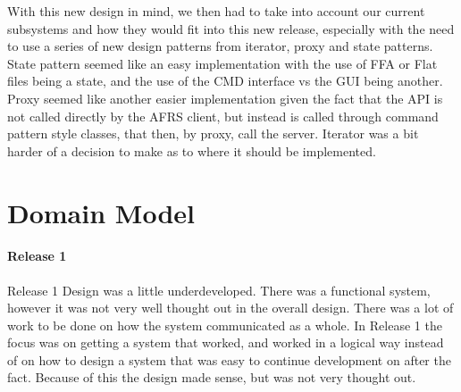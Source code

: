\documentclass[12pt]{report}
\begin{document}
    \indent
    With this new design in mind, we then had to take into account our current subsystems and how they would fit into this new release, especially with the need to use a series of new design patterns from iterator, proxy and state patterns.
    State pattern seemed like an easy implementation with the use of FFA or Flat files being a state, and the use of the CMD interface vs the GUI being another.
    Proxy seemed like another easier implementation given the fact that the API is not called directly by the AFRS client, but instead is called through command pattern style classes, that then, by proxy, call the server.
    Iterator was a bit harder of a decision to make as to where it should be implemented.

    \newpage
    \section*{Domain Model}\label{sec:domainModel}

    \paragraph{Release 1}

    \indent
    Release 1 Design was a little underdeveloped.
    There was a functional system, however it was not very well thought out in the overall design.
    There was a lot of work to be done on how the system communicated as a whole.
    In Release 1 the focus was on getting a system that worked, and worked in a logical way instead of on how to design a system that was easy to continue development on after the fact.
    Because of this the design made sense, but was not very thought out.

    \begin{center}
    \end{center}
\end{document}
